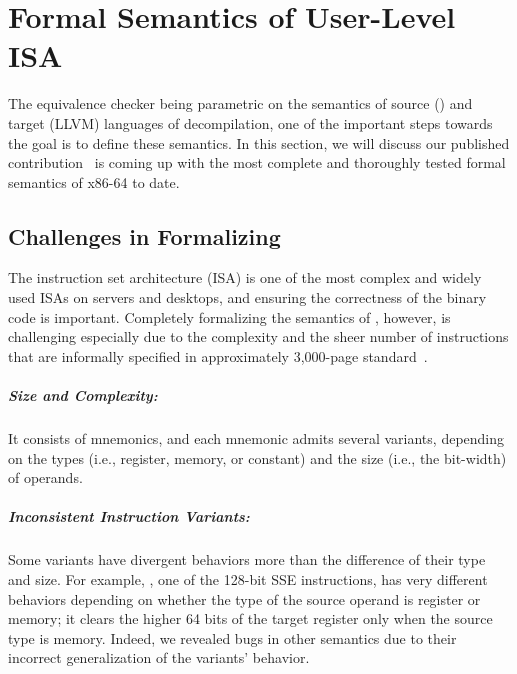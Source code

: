 \chapter{Formal Semantics of \ISA User-Level ISA}\label{sec:results}
The equivalence checker being parametric on the semantics of source (\ISA) and target (LLVM) languages of decompilation, one of the important steps towards the goal is to define these semantics. In this section, we will discuss our published contribution~\cite{DasguptaAdve:PLDI19} is coming up with the most complete and thoroughly tested formal
semantics of x86-64 to date.


\section{Challenges in Formalizing \ISA}
\label{sec:challenges-in-formalizing-x86}
The \ISA instruction set architecture (ISA) is one of the most complex and widely used ISAs on servers and desktops, and ensuring the correctness of the \ISA binary code is important.
%
Completely formalizing the semantics of \ISA, however, is challenging especially due to the complexity and the sheer number of instructions that are informally specified in approximately 3,000-page standard~\cite{IntelManual}.

\paragraph{Size and Complexity:}
%
It consists of \totalIntel{} mnemonics, and each mnemonic admits several variants, depending on the types (i.e., register, memory, or constant) and the size (i.e., the bit-width) of operands.

\paragraph{Inconsistent Instruction Variants:}
%
Some variants have divergent behaviors more than the difference of their type and size. For example, , one of the 128-bit SSE instructions, has very different behaviors depending on whether the type of the source operand is register or memory; it clears the higher 64 bits of the target register only when the source type is memory.
Indeed, we revealed bugs in other semantics due to their incorrect generalization of the variants' behavior.

